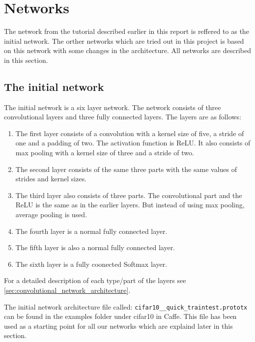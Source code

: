 \graphicspath{{Chapters/Project/}}

\section{Networks} %
\label{sec:networks}

The network from the tutorial described earlier in this report is reffered to
as the initial network. The orther networks which are tried out in this
project is based on this network with some changes in the architecture. All
networks are described in this section.

\subsection{The initial network} %
\label{sub:the_initial_network}

The initial network is a six layer network. The network consists of three
convolutional layers and three fully connected layers. The layers are as
follows:

\begin{enumerate}
	\item The first layer consists of a convolution with a kernel size of five, a
	stride of one and a padding of two. The activation function is ReLU. It
	also consists of max pooling with a kernel size of three and a stride of two.
	\item The second layer consists of the same three parts with the same values
	of strides and kernel sizes.
	\item The third layer also consists of three parts. The convolutional part
	and the ReLU is the same as in the earlier layers. But instead of using max
	pooling, average pooling is used.
	\item The fourth layer is a normal fully connected layer.
	\item The fifth layer is also a normal fully connected layer.
	\item The sixth layer is a fully coonected Softmax layer.
\end{enumerate}
For a detailed description of each type/part of the layers see
\autoref{sec:convolutional_network_architecture}.

The initial network architecture file called:
\verb|cifar10__quick_traintest.prototx| can be found in the examples folder
under cifar10 in Caffe\cite{caffe}. This file has been used as a starting point
for all our networks which are explaind later in this section. 

